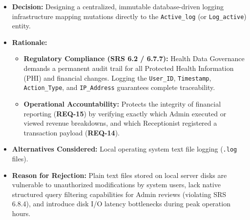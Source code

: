 \begin{itemize}
	\item \textbf{Decision:} Designing a centralized, immutable database-driven logging infrastructure mapping mutations directly to the \texttt{Active\_log} (or \texttt{Log\_active}) entity.
	\item \textbf{Rationale:} 
	\begin{itemize}
		\item \textbf{Regulatory Compliance (SRS 6.2 / 6.7.7):} Health Data Governance demands a permanent audit trail for all Protected Health Information (PHI) and financial changes. Logging the \texttt{User\_ID}, \texttt{Timestamp}, \texttt{Action\_Type}, and \texttt{IP\_Address} guarantees complete traceability.
		\item \textbf{Operational Accountability:} Protects the integrity of financial reporting (\textbf{REQ-15}) by verifying exactly which Admin executed or viewed revenue breakdowns, and which Receptionist registered a transaction payload (\textbf{REQ-14}).
	\end{itemize}
	\item \textbf{Alternatives Considered:} Local operating system text file logging (\texttt{.log} files).
	\item \textbf{Reason for Rejection:} Plain text files stored on local server disks are vulnerable to unauthorized modifications by system users, lack native structured query filtering capabilities for Admin reviews (violating SRS 6.8.4), and introduce disk I/O latency bottlenecks during peak operation hours.
\end{itemize}